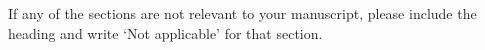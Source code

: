 \documentclass[12pt]{sn-jnl}%
\theoremstyle{thmstyleone}%
\theoremstyle{thmstyletwo}%
\theoremstyle{thmstylethree}%
\begin{document}
\begin{itemize}






\end{itemize}

\noindent
If any of the sections are not relevant to your manuscript, please include the heading and write `Not applicable' for that section. 
\end{document}
